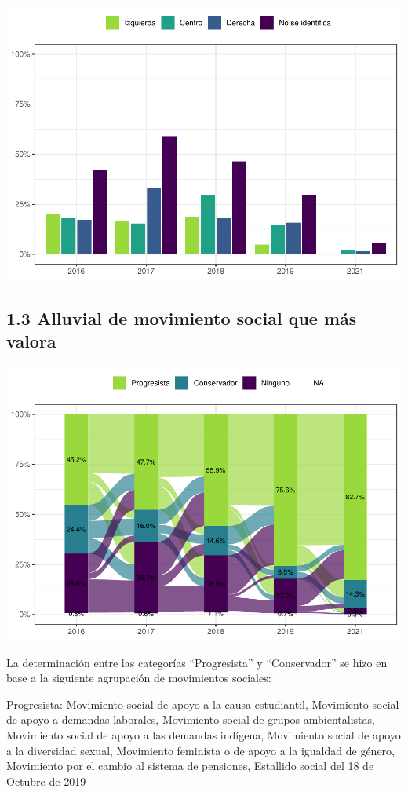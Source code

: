 \documentclass[
  12pt,
]{book}
\begin{document}
\includegraphics{reporte-elsoc_files/figure-latex/unnamed-chunk-7-1.pdf}

\hypertarget{alluvial-de-movimiento-social-que-muxe1s-valora}{%
\subsection{1.3 Alluvial de movimiento social que más valora}\label{alluvial-de-movimiento-social-que-muxe1s-valora}}

\includegraphics{reporte-elsoc_files/figure-latex/unnamed-chunk-8-1.pdf}

La determinación entre las categorías ``Progresista'' y ``Conservador'' se hizo en base a la siguiente agrupación de movimientos sociales:

Progresista: Movimiento social de apoyo a la causa estudiantil, Movimiento social de apoyo a demandas laborales, Movimiento social de grupos ambientalistas, Movimiento social de apoyo a las demandas indígena, Movimiento social de apoyo a la diversidad sexual, Movimiento feminista o de apoyo a la igualdad de género, Movimiento por el cambio al sistema de pensiones, Estallido social del 18 de Octubre de 2019
\end{document}
